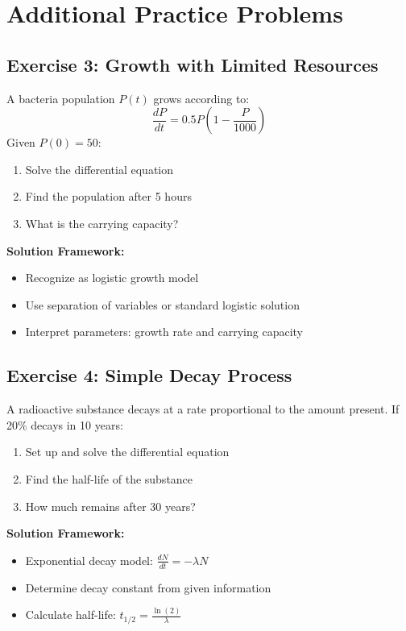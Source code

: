 \documentclass[12pt, letterpaper]{book}
\theoremstyle{problemstyle}
\theoremstyle{solutionstyle}
\begin{document}
\section{Additional Practice Problems}

\subsection{Exercise 3: Growth with Limited Resources}
A bacteria population $P(t)$ grows according to:
$$\frac{dP}{dt} = 0.5P\left(1-\frac{P}{1000}\right)$$
Given $P(0) = 50$:
\begin{enumerate}
    \item Solve the differential equation
    \item Find the population after 5 hours
    \item What is the carrying capacity?
\end{enumerate}

\textbf{Solution Framework:}
\begin{itemize}
    \item Recognize as logistic growth model
    \item Use separation of variables or standard logistic solution
    \item Interpret parameters: growth rate and carrying capacity
\end{itemize}

\subsection{Exercise 4: Simple Decay Process}
A radioactive substance decays at a rate proportional to the amount present. If 20\% decays in 10 years:
\begin{enumerate}
    \item Set up and solve the differential equation
    \item Find the half-life of the substance
    \item How much remains after 30 years?
\end{enumerate}

\textbf{Solution Framework:}
\begin{itemize}
    \item Exponential decay model: $\frac{dN}{dt} = -\lambda N$
    \item Determine decay constant from given information
    \item Calculate half-life: $t_{1/2} = \frac{\ln(2)}{\lambda}$
\end{itemize}
\end{document}
